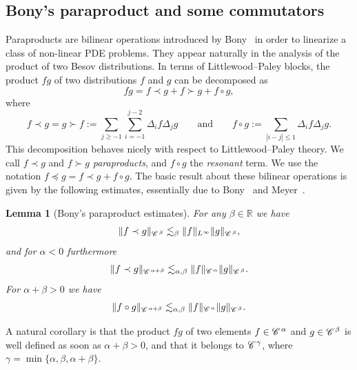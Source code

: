 \documentclass[a4paper,11pt]{article}
\newcommand{\assign}{:=}
\newcommand{\tmtextit}[1]{{\itshape{#1}}}
\newtheorem{lemma}[theorem]{Lemma}
{\theorembodyfont{\rmfamily}\newtheorem{remark}[theorem]{Remark}}
\newcommand{\CC}{\mathscr{C} \hspace{.1em}}
\begin{document}
\subsection{Bony's paraproduct and some commutators}\label{sec:bony}

Paraproducts are bilinear operations introduced by Bony~{\cite{Bony1981}} in
order to linearize a class of non-linear PDE problems. They appear naturally
in the analysis of the product of two Besov distributions. In terms of
Littlewood--Paley blocks, the product $fg$ of two distributions $f$ and $g$
can be decomposed as
\[ fg = f \prec g + f \succ g + f \circ g, \]
where
\[ f \prec g = g \succ f \assign \sum_{j \geqslant - 1} \sum_{i = - 1}^{j - 2}
   \Delta_i f \Delta_j g \qquad \text{and} \qquad f \circ g \assign \sum_{|i -
   j| \leqslant 1} \Delta_i f \Delta_j g. \]
This decomposition behaves nicely with respect to Littlewood--Paley theory. We
call $f \prec g$ and $f \succ g$ \tmtextit{paraproducts}, and $f \circ g$ the
\tmtextit{resonant} term. We use the notation $f \preccurlyeq g = f \prec g +
f \circ g$. The basic result about these bilinear operations is given by the
following estimates, essentially due to Bony~{\cite{Bony1981}} and
Meyer~{\cite{Meyer1981}}.

\begin{lemma}[Bony's paraproduct estimates]
  \label{thm:paraproduct} For any $\beta \in \mathbb{R}$ we have
  \begin{equation}
    \label{eq:para-1} \|f \prec g\|_{\CC^{\beta}} \lesssim_{\beta}
    \|f\|_{L^{\infty}} \|g\|_{\CC^{\beta}},
  \end{equation}
  and for $\alpha < 0$ furthermore
  \begin{equation}
    \label{eq:para-2} \|f \prec g\|_{\CC^{\alpha + \beta}} \lesssim_{\alpha,
    \beta} \|f\|_{\CC^{\alpha}} \|g\|_{\CC^{\beta}} .
  \end{equation}
  For $\alpha + \beta > 0$ we have
  \begin{equation}
    \label{eq:para-3} \|f \circ g\|_{\CC^{\alpha + \beta}} \lesssim_{\alpha,
    \beta} \|f\|_{\CC^{\alpha}} \|g\|_{\CC^{\beta}} .
  \end{equation}
\end{lemma}

A natural corollary is that the product $fg$ of two elements $f \in
\CC^{\alpha}$ and $g \in \CC^{\beta}$ is well defined as soon as $\alpha +
\beta > 0$, and that it belongs to $\CC^{\gamma}$, where $\gamma = \min
\{\alpha, \beta, \alpha + \beta\}$.
\end{document}
